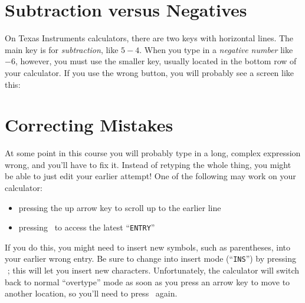 \clearpage
\section{Subtraction versus Negatives}

On Texas Instruments calculators, there are two keys with horizontal lines.
The main \calckey{-} key is for \emph{subtraction}, like $5-4$.
When you type in a \emph{negative number} like $-6$, however, 
you must use the smaller \calckey{(-)} key, usually located in the bottom row
of your calculator.
If you use the wrong button, you will probably see a screen like this:

\section{Correcting Mistakes}

At some point in this course you will probably type in a long, complex expression wrong,
and you'll have to fix it.
Instead of retyping the whole thing, you might be able to just edit your earlier attempt!
One of the following may work on your calculator:
\begin{itemize}
  \item pressing the up arrow key \fbox{$\blacktriangle$} to scroll up to the earlier line
  \item pressing \, 
        to access the latest ``{\tt\footnotesize ENTRY}''
\end{itemize}
If you do this, you might need to insert new symbols, such as parentheses, into your earlier wrong entry.
Be sure to change into insert mode (``{\tt \footnotesize INS}'')
by pressing \,\,;
this will let you insert new characters.
Unfortunately, the calculator will switch back to normal ``overtype'' mode as soon as you press an arrow key to move to another location,
so you'll need to press \, again.
